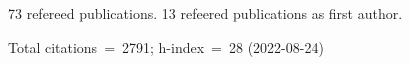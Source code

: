 73 refereed publications. 13 refeered publications as first author.

Total citations~=~2791; h-index~=~28 (2022-08-24)